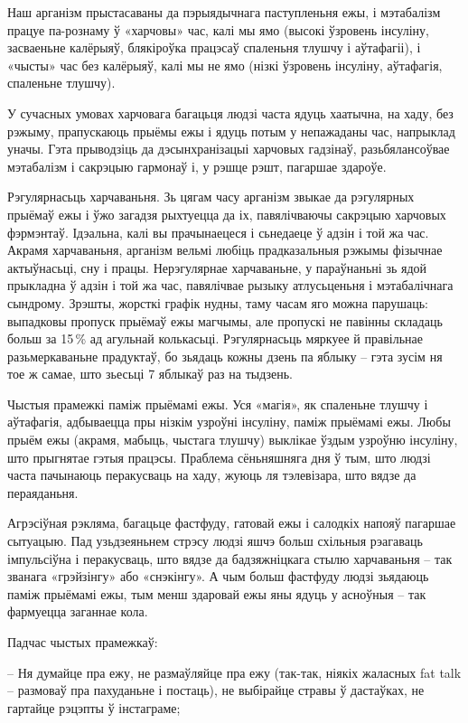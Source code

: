 Наш арганізм прыстасаваны да пэрыядычнага паступленьня ежы, і мэтабалізм працуе па-рознаму ў «харчовы» час, калі мы ямо (высокі ўзровень інсуліну, засваеньне калёрыяў, блякіроўка працэсаў спаленьня тлушчу і аўтафагіі), і «чысты» час без калёрыяў, калі мы не ямо (нізкі ўзровень інсуліну, аўтафагія, спаленьне тлушчу).

У сучасных умовах харчовага багацьця людзі часта ядуць хаатычна, на хаду, без рэжыму, прапускаюць прыёмы ежы і ядуць потым у непажаданы час, напрыклад уначы. Гэта прыводзіць да дэсынхранізацыі харчовых гадзінаў, разьбялансоўвае мэтабалізм і сакрэцыю гармонаў і, у рэшце рэшт, пагаршае здароўе.

Рэгулярнасьць харчаваньня. Зь цягам часу арганізм звыкае да рэгулярных прыёмаў ежы і ўжо загадзя рыхтуецца да іх, павялічваючы сакрэцыю харчовых фэрмэнтаў. Ідэальна, калі вы прачынаецеся і сьнедаеце ў адзін і той жа час. Акрамя харчаваньня, арганізм вельмі любіць прадказальныя рэжымы фізычнае актыўнасьці, сну і працы. Нерэгулярнае харчаваньне, у параўнаньні зь ядой прыкладна ў адзін і той жа час, павялічвае рызыку атлусьценьня і мэтабалічнага сындрому. Зрэшты, жорсткі графік нудны, таму часам яго можна парушаць: выпадковы пропуск прыёмаў ежы магчымы, але пропускі не павінны складаць больш за 15\,\% ад агульнай колькасьці. Рэгулярнасьць мяркуее й правільнае разьмеркаваньне прадуктаў, бо зьядаць кожны дзень па яблыку – гэта зусім ня тое ж самае, што зьесьці 7 яблыкаў раз на тыдзень.

Чыстыя прамежкі паміж прыёмамі ежы. Уся «магія», як спаленьне тлушчу і аўтафагія, адбываецца пры нізкім узроўні інсуліну, паміж прыёмамі ежы. Любы прыём ежы (акрамя, мабыць, чыстага тлушчу) выклікае ўздым узроўню інсуліну, што прыгнятае гэтыя працэсы. Праблема сёньняшняга дня ў тым, што людзі часта пачынаюць перакусваць на хаду, жуюць ля тэлевізара, што вядзе да пераяданьня.

Агрэсіўная рэкляма, багацьце фастфуду, гатовай ежы і салодкіх напояў пагаршае сытуацыю. Пад узьдзеяньнем стрэсу людзі яшчэ больш схільныя рэагаваць імпульсіўна і перакусваць, што вядзе да бадзяжніцкага стылю харчаваньня – так званага «грэйзінгу» або «снэкінгу». А чым больш фастфуду людзі зьядаюць паміж прыёмамі ежы, тым менш здаровай ежы яны ядуць у асноўныя – так фармуецца заганнае кола.

Падчас чыстых прамежкаў: 

– Ня думайце пра ежу, не размаўляйце пра ежу (так-так, ніякіх жаласных fat talk – размоваў пра пахуданьне і постаць), не выбірайце стравы ў дастаўках, не гартайце рэцэпты ў інстаграме;

